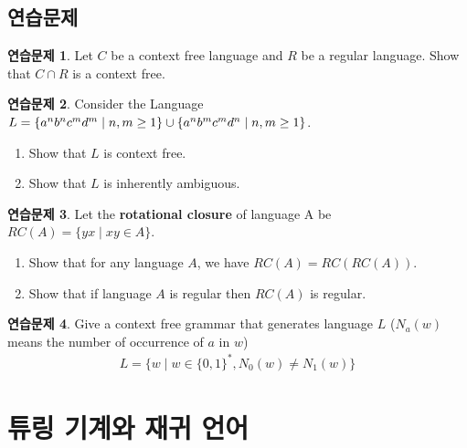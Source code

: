 \documentclass[b5paper]{book}
\theoremstyle{definition}
\newtheorem{ec}{연습문제}[chapter]
\begin{document}
\section{연습문제}
\begin{ec}
    Let $C$ be a context free language and $R$ be a regular language. 
    Show that $C \cap R$ is a context free. 
\end{ec}
\begin{ec}
    Consider the Language $L = \{a^nb^nc^md^m \;\vert\; n, m \ge 1\} \\ \cup \{a^nb^mc^md^n \;\vert\; n,m \ge 1\}$.
    \begin{enumerate}
        \item Show that $L$ is context free.
        \item Show that $L$ is inherently ambiguous. 
    \end{enumerate}
\end{ec}
\begin{ec}
    Let the \textbf{rotational closure} of language A be $RC(A) = \{yx\;\vert\; xy \in A\}$.
    \begin{enumerate}
        \item Show that for any language $A$, we have $RC(A) = RC(RC(A))$.
        \item Show that if language $A$ is regular then $RC(A)$ is regular.
    \end{enumerate}
\end{ec}
\begin{ec}
    Give a context free grammar that generates language $L$ 
    ($N_a(w)$ means the number of occurrence of $a$ in $w$) 
    \begin{align*}
        L = \{ w \;\vert\; w \in \{0,1\}^*, N_0(w) \neq N_1(w) \}
    \end{align*}
\end{ec}
\chapter{튜링 기계와 재귀 언어} 
\end{document}
